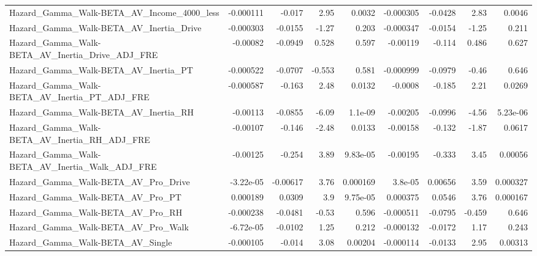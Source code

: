 \begin{tabular}{lrrrrrrrr}
Hazard\_Gamma\_Walk-BETA\_AV\_Income\_4000\_less         &   -0.000111 &       -0.017 &     2.95 &   0.0032 &  -0.000305 &     -0.0428 &         2.83 &        0.0046 \\
Hazard\_Gamma\_Walk-BETA\_AV\_Inertia\_Drive            &   -0.000303 &      -0.0155 &    -1.27 &    0.203 &  -0.000347 &     -0.0154 &        -1.25 &         0.211 \\
Hazard\_Gamma\_Walk-BETA\_AV\_Inertia\_Drive\_ADJ\_FRE    &    -0.00082 &      -0.0949 &    0.528 &    0.597 &   -0.00119 &      -0.114 &        0.486 &         0.627 \\
Hazard\_Gamma\_Walk-BETA\_AV\_Inertia\_PT               &   -0.000522 &      -0.0707 &   -0.553 &    0.581 &  -0.000999 &     -0.0979 &        -0.46 &         0.646 \\
Hazard\_Gamma\_Walk-BETA\_AV\_Inertia\_PT\_ADJ\_FRE       &   -0.000587 &       -0.163 &     2.48 &   0.0132 &    -0.0008 &      -0.185 &         2.21 &        0.0269 \\
Hazard\_Gamma\_Walk-BETA\_AV\_Inertia\_RH               &    -0.00113 &      -0.0855 &    -6.09 &  1.1e-09 &   -0.00205 &     -0.0996 &        -4.56 &      5.23e-06 \\
Hazard\_Gamma\_Walk-BETA\_AV\_Inertia\_RH\_ADJ\_FRE       &    -0.00107 &       -0.146 &    -2.48 &   0.0133 &   -0.00158 &      -0.132 &        -1.87 &        0.0617 \\
Hazard\_Gamma\_Walk-BETA\_AV\_Inertia\_Walk\_ADJ\_FRE     &    -0.00125 &       -0.254 &     3.89 & 9.83e-05 &   -0.00195 &      -0.333 &         3.45 &       0.00056 \\
Hazard\_Gamma\_Walk-BETA\_AV\_Pro\_Drive                &   -3.22e-05 &     -0.00617 &     3.76 & 0.000169 &    3.8e-05 &     0.00656 &         3.59 &      0.000327 \\
Hazard\_Gamma\_Walk-BETA\_AV\_Pro\_PT                   &    0.000189 &       0.0309 &      3.9 & 9.75e-05 &   0.000375 &      0.0546 &         3.76 &      0.000167 \\
Hazard\_Gamma\_Walk-BETA\_AV\_Pro\_RH                   &   -0.000238 &      -0.0481 &    -0.53 &    0.596 &  -0.000511 &     -0.0795 &       -0.459 &         0.646 \\
Hazard\_Gamma\_Walk-BETA\_AV\_Pro\_Walk                 &   -6.72e-05 &      -0.0102 &     1.25 &    0.212 &  -0.000132 &     -0.0172 &         1.17 &         0.243 \\
Hazard\_Gamma\_Walk-BETA\_AV\_Single                   &   -0.000105 &       -0.014 &     3.08 &  0.00204 &  -0.000114 &     -0.0133 &         2.95 &       0.00313 \\

\end{tabular}
